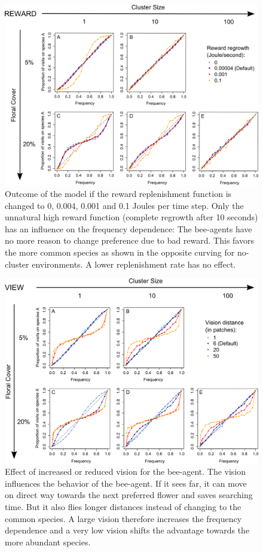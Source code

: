 \begin{figure} [!h] %
	\centering
	\includegraphics[width=14cm]{Images/SA_reward}
	\caption{Outcome of the model if the reward replenishment function is changed to 0, 0.004, 0.001 and 0.1 Joules per time step. Only the unnatural high reward function (complete regrowth after 10 seconds) has an influence on the frequency dependence: The bee-agents have no more reason to change preference due to bad reward. This favors the more common species as shown in the opposite curving for no-cluster environments. A lower replenishment rate has no effect.} 
	\label{fig:SA_reward}
\end{figure}

\clearpage


\begin{figure} [!h]
	\centering
	\includegraphics[width=14cm]{Images/SA_view}
	\caption{Effect of increased or reduced vision for the bee-agent. The vision influences the behavior of the bee-agent. If it sees far, it can move on direct way towards the next preferred flower and saves searching time. But it also flies longer distances instead of changing to the common species. A large vision therefore increases the frequency dependence and a very low vision shifts the advantage towards the more abundant species.}
	\label{fig:SA_view}
\end{figure}

